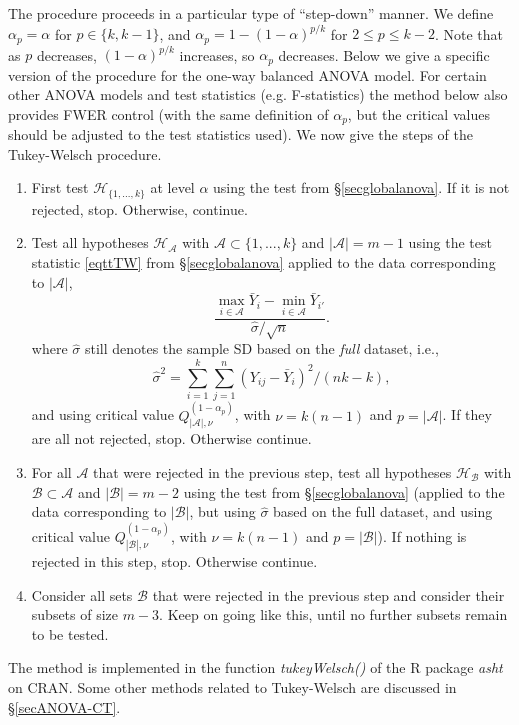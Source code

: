 \documentclass[11pt]{article}
\theoremstyle{plain}
\theoremstyle{definition}
\newcommand{\A}{\mathcal{A}}
\newcommand{\B}{\mathcal{B}}
\newcommand{\Hy}{\mathcal{H}}
\begin{document}
The procedure proceeds in a particular type of ``step-down'' manner. We define $\alpha_p=\alpha$ for $p\in \{k,k-1\}$, and $\alpha_p = 1-(1-\alpha)^{p/k}$ for $2\leq p\leq k-2$. Note that as $p$ decreases, $(1-\alpha)^{p/k}$ increases, so $\alpha_p$ decreases. Below we give a specific version of the procedure for the one-way balanced ANOVA model. For certain other ANOVA models and test statistics (e.g. F-statistics) the method below also provides FWER control (with the same definition of $\alpha_p$, but the critical values should be adjusted to the test statistics used). We now give the steps of the Tukey-Welsch procedure.


\begin{enumerate}
\item First test $\Hy_{\{1,...,k\}}$ at level $\alpha$ using the test from \S\ref{secglobalanova}. If it is not rejected, stop. Otherwise, continue.
\item 
Test all hypotheses $\Hy_{\A}$ with $\A\subset\{1,...,k\}$ and $|\A|=m-1$ using the test statistic \eqref{eqttTW} from \S\ref{secglobalanova} applied to the data corresponding to $|\A|$, 
$$\frac{\max_{i\in \A} \bar{Y}_i- \min_{i\in \A}\bar{Y}_{i'}}{\hat{\sigma}/\sqrt{n}}.$$
where $\hat{\sigma}$ still denotes the sample SD based on the \emph{full} dataset, i.e., 
$$\hat{\sigma}^2=\sum_{i=1}^k \sum_{j=1}^{n} (Y_{ij}-\bar{Y}_{i})^2/(nk-k),$$
 and using critical value $Q_{|\A|,\nu}^{(1-\alpha_p)}$, with $\nu=k(n-1)$ and $p=|\A|$. If they are all not rejected, stop. Otherwise continue.
\item For all $\A$ that were rejected in the previous step,  test all hypotheses $\Hy_{\B}$ with $\B\subset\A$ and $|\B|=m-2$ using the test from \S\ref{secglobalanova} (applied to the data corresponding to $|\B|$, but using $\hat{\sigma}$ based on the full dataset, and using critical value $Q_{|\B|,\nu}^{(1-\alpha_p)}$, with $\nu=k(n-1)$ and $p=|\B|$). If nothing is rejected in this step, stop. Otherwise continue.
\item Consider all sets $\B$ that were rejected in the previous step and consider their subsets of size $m-3$. Keep on going like this, until no further subsets remain to be tested.
\end{enumerate}




 The method is implemented in the function \emph{tukeyWelsch()} of the R package \emph{asht} on CRAN. Some other methods related to Tukey-Welsch are discussed in \S\ref{secANOVA-CT}.
\end{document}

